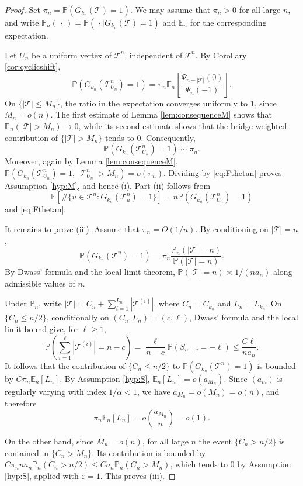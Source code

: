 \documentclass[a4paper,11pt]{article}
\newcommand{\E}{\mathbb{E}}
\DeclareRobustCommand{\P}{\mathbb{P}}
\DeclareRobustCommand{\1}{\mathbf{1}}
\begin{document}
\begin{proof}
Set $\pi_n=\P(G_{k_n}(\mathcal T)=1)$. We may assume that $\pi_n>0$ for all
large $n$, and write
$\P_n(\,\cdot\,)=\P(\,\cdot\mid G_{k_n}(\mathcal T)=1)$ and $\E_n$ for the
corresponding expectation.

Let $U_n$ be a uniform vertex of $\mathcal T^n$, independent of
$\mathcal T^n$. By Corollary \ref{cor:cyclicshift},
$$
\P(G_{k_n}(\mathcal T^n_{U_n})=1)
=
\pi_n\E_n\left[
\frac{\Psi_{n-|\mathcal T|}(0)}{\Psi_n(-1)}
\right].
$$
On $\{|\mathcal T|\le M_n\}$, the ratio in the expectation converges
uniformly to $1$, since $M_n=o(n)$. The first estimate of
Lemma \ref{lem:consequenceM} shows that
$\P_n(|\mathcal T|>M_n)\to0$, while its second estimate shows that the
bridge-weighted contribution of $\{|\mathcal T|>M_n\}$ tends to $0$.
Consequently,
\begin{equation}
\label{eq:Fthetan}
\P(G_{k_n}(\mathcal T^n_{U_n})=1)\sim\pi_n.
\end{equation}
Moreover, again by Lemma \ref{lem:consequenceM},
$
\P(
G_{k_n}(\mathcal T^n_{U_n})=1,\
|\mathcal T^n_{U_n}|>M_n
)
=o(\pi_n)$.
Dividing by \eqref{eq:Fthetan} proves Assumption \ref{hyp:M}, and hence
\textup{(i)}. Part \textup{(ii)} follows from
$$
\E\left[
\#\{u\in\mathcal T^n:G_{k_n}(\mathcal T^n_u)=1\}
\right]
=
n\P(G_{k_n}(\mathcal T^n_{U_n})=1)
$$
and \eqref{eq:Fthetan}.

It remains to prove \textup{(iii)}. Assume that $\pi_n=O(1/n)$. By
conditioning on $|\mathcal T|=n$,
$$
\P(G_{k_n}(\mathcal T^n)=1)
=
\pi_n\frac{\P_n(|\mathcal T|=n)}{\P(|\mathcal T|=n)}.
$$
By Dwass' formula and the local limit theorem,
$\P(|\mathcal T|=n)\asymp 1/(na_n)$ along admissible values of $n$.

Under $\P_n$, write
$|\mathcal T|=C_n+\sum_{i=1}^{L_n}|\mathcal T^{(i)}|$, where
$C_n=C_{k_n}$ and $L_n=L_{k_n}$. On $\{C_n\le n/2\}$, conditionally on
$(C_n,L_n)=(c,\ell)$, Dwass' formula and the local limit bound give, for
$\ell\ge1$,
$$
\P\left(\sum_{i=1}^{\ell}|\mathcal T^{(i)}|=n-c\right)
=
\frac{\ell}{n-c}\P(S_{n-c}=-\ell)
\le
\frac{C\ell}{na_n}.
$$
It follows that the contribution of $\{C_n\le n/2\}$ to
$\P(G_{k_n}(\mathcal T^n)=1)$ is bounded by
$C\pi_n\E_n[L_n]$. By Assumption \ref{hyp:S},
$\E_n[L_n]=o(a_{M_n})$. Since $(a_m)$ is regularly varying with index
$1/\alpha<1$, we have $a_{M_n}=o(M_n)=o(n)$, and therefore
$$
\pi_n\E_n[L_n]
=
o\left(\frac{a_{M_n}}{n}\right)
=
o(1).
$$

On the other hand, since $M_n=o(n)$, for all large $n$ the event
$\{C_n>n/2\}$ is contained in $\{C_n>M_n\}$. Its contribution is bounded by
$
C\pi_nna_n\P_n(C_n>n/2)
\le
C a_n\P_n(C_n>M_n)
$,
which tends to $0$ by Assumption \ref{hyp:S}, applied with
$\varepsilon=1$. This proves \textup{(iii)}.
\end{proof}
\end{document}
